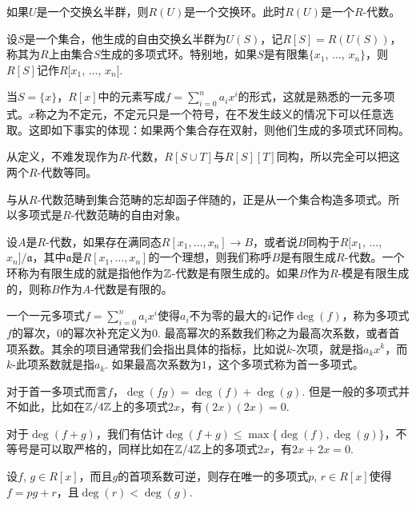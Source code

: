 如果$U$是一个交换幺半群，则$R(U)$是一个交换环。此时$R(U)$是一个$R$-代数。

\para 设$S$是一个集合，他生成的自由交换幺半群为$U(S)$，记$R[S]=R(U(S))$，称其为$R$上由集合$S$生成的多项式环。特别地，如果$S$是有限集$\{x_1$, $\dots$, $x_n\}$，则$R[S]$记作$R[x_1$, $\dots$, $x_n]$. 

当$S=\{x\}$，$R[x]$中的元素写成$f=\sum_{i=0}^na_ix^i$的形式，这就是熟悉的一元多项式。$x$称之为不定元，不定元只是一个符号，在不发生歧义的情况下可以任意选取。这即如下事实的体现：如果两个集合存在双射，则他们生成的多项式环同构。

从定义，不难发现作为$R$-代数，$R[S\cup T]$与$R[S][T]$同构，所以完全可以把这两个$R$-代数等同。

与从$R$-代数范畴到集合范畴的忘却函子伴随的，正是从一个集合构造多项式。所以多项式是$R$-代数范畴的自由对象。

\para 设$A$是$R$-代数，如果存在满同态$R[x_1,\dots ,x_n]\to B$，或者说$B$同构于$R[x_1$, $\dots$, $x_n]/\mathfrak{a}$，其中$\mathfrak{a}$是$R[x_1,\dots ,x_n]$的一个理想，则我们称呼$B$是有限生成$R$-代数。一个环称为有限生成的就是指他作为$\mathbb{Z}$-代数是有限生成的。如果$B$作为$R$-模是有限生成的，则称$B$作为$A$-代数是有限的。

\para 一个一元多项式$f=\sum_{i=0}^na_ix^i$使得$a_i$不为零的最大的$i$记作$\deg(f)$，称为多项式$f$的幂次，$0$的幂次补充定义为$0$. 最高幂次的系数我们称之为最高次系数，或者首项系数。其余的项目通常我们会指出具体的指标，比如说$k$-次项，就是指$a_kx^k$，而$k$-此项系数就是指$a_k$. 如果最高次系数为$1$，这个多项式称为首一多项式。

对于首一多项式而言$f$，$\deg(fg)=\deg(f)+\deg(g)$. 但是一般的多项式并不如此，比如在$\mathbb{Z}/4\mathbb{Z}$上的多项式$2x$，有$(2x)(2x)=0$.

对于$\deg(f+g)$，我们有估计$\deg(f+g)\leq \max\{\deg(f),\deg(g)\}$，不等号是可以取严格的，同样比如在$\mathbb{Z}/4\mathbb{Z}$上的多项式$2x$，有$2x+2x=0$.

\begin{thm}[多项式除法算法]
设$f$, $g\in R[x]$，而且$g$的首项系数可逆，则存在唯一的多项式$p$, $r\in R[x]$使得$f=pg+r$，且$\deg(r)<\deg(g)$.
\end{thm}

